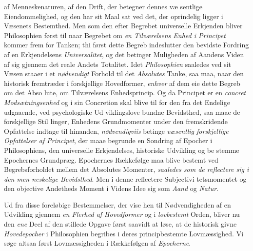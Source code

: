 af Menneskenaturen, af den Drift, der betegner dennes væ\-%
sentlige Eiendommelighed, og den har sit Maal sat ved det,
der oprindelig ligger i Væsenets Bestemthed. Men som den
efter Begrebet universelle Erkjenden bliver Philosophien først
til naar Begrebet om \emph{en Tilværelsens Enhed i Principet}
kommer frem for Tanken; thi først dette Begreb indeslutter
den bevidste Fordring af en Erkjendelsens \emph{Universalitet}, og
det betinger Muligheden af Aandens Viden af sig gjennem det
reale Andets Totalitet. Idet \emph{Philosophien} saaledes ved sit
Væsen staaer i et \emph{nødvendigt} Forhold til det \emph{Absolutes}
Tanke, saa maa, naar den historisk fremtræder i forskjellige
Hovedformer, \emph{enhver} af dem eie dette Begreb om det Abso\-%
lute, om Tilværelsens Enhedsprincip. Og da Principet er en
\emph{concret Modsætningsenhed} og i sin Concretion skal blive
til for den fra det Endelige udgaaende, ved psychologiske Ud\-%
viklingslove bundne Bevidsthed, saa maae de forskjellige Stil\-%
linger, Enhedens Grundmomenter under den fremskridende
Opfattelse indtage til hinanden, \emph{nødvendigviis} betinge
\emph{væsentlig forskjellige Opfattelser af Principet}, der
maae begrunde en Sondring af Epocher i Philosophiens,
den universelle Erkjendelses, historiske Udvikling og be\-%
stemme Epochernes Grundpræg. Epochernes Rækkefølge maa
blive bestemt ved Begrebsforholdet mellem det Absolutes
Momenter, \emph{saaledes som de reflectere sig i den men\-%
neskelige Bevidsthed}. Men i denne reflectere Subjectivi\-%
tetsmomentet og den objective Andetheds Moment i Videns
Idee sig som \emph{Aand} og \emph{Natur}.

Ud fra disse foreløbige Bestemmelser, der vise hen til
Nødvendigheden af en Udvikling gjennem \emph{en Flerhed af
Hovedformer} og i \emph{lovbestemt} Orden, bliver nu den
\emph{ene} Deel af den stillede Opgave først saavidt at løse, at de
historisk givne \emph{Hovedepocher} i Philosophien begribes i
deres principbestemte Lovmæssighed. Vi søge altsaa først
Lovmæssigheden i Rækkefølgen af \emph{Epocherne}.
\divrule

